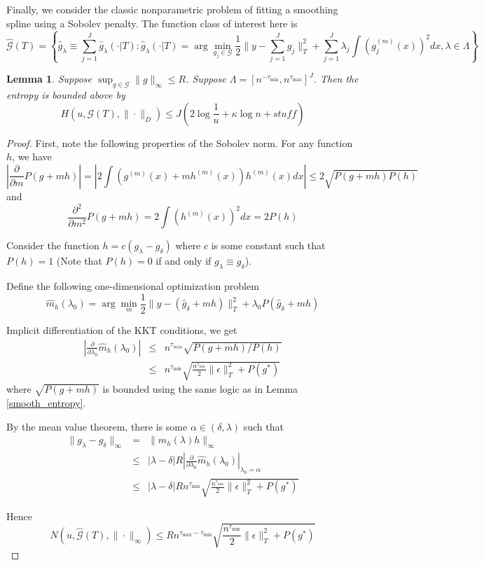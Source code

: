 \documentclass[12pt]{article}
\newtheorem{lemma}{Lemma}
\begin{document}
Finally, we consider the classic nonparametric problem of fitting a smoothing spline using a Sobolev penalty. The function class of interest here is
\[
\hat{\mathcal{G}}(T)=\left\{\hat{g}_\lambda \equiv \sum_{j=1}^J \hat{g}_{\lambda}(\cdot|T) :  \hat{g}_{\lambda}(\cdot|T)=\arg\min_{g_j\in\mathcal{G}}\frac{1}{2}\|y- \sum_{j=1}^J g_j\|_{T}^{2}+ \sum_{j=1}^J \lambda_j \int (g_j^{(m)}(x))^2 dx , \lambda\in\Lambda\right\} 
\]

\begin{lemma}
Suppose $\sup_{g \in \mathcal{G}} \|g\|_\infty \le R$.
Suppose $\Lambda = [n^{- \tau_{\min}} , n^{\tau_{\max}}]^J$. 
Then the entropy is bounded above by
\begin{equation}
H \left ( u, \mathcal{G}(T), \| \cdot \|_D \right ) \le J \left ( 2 \log \frac{1}{u} + \kappa \log n + stuff \right )
\end{equation}
\end{lemma}

\begin{proof}
First, note the following properties of the Sobolev norm. For any function $h$, we have
\[
\left | \frac{\partial}{\partial m}P(g+mh) \right | = \left | 2\int(g^{(m)}(x)+mh^{(m)}(x))h^{(m)}(x)dx \right | \le 2\sqrt{P(g+mh)P(h)}
\]
and 
\[
\frac{\partial^{2}}{\partial m^{2}}P(g+mh)=2\int(h^{(m)}(x))^{2}dx=2P(h)
\]

Consider the function $h=c(g_{\lambda}-g_{\delta})$ where $c$ is some constant such that $P(h) = 1$ (Note that $P(h) = 0$ if and only if $g_{\lambda} \equiv g_{\delta}$).

Define the following one-dimensional optimization problem
\[
\hat{m}_{h}(\lambda_0)=\arg\min_{m}\frac{1}{2}\|y-(\hat{g}_{\delta}+mh)\|_{T}^{2}+\lambda_0 P(\hat{g}_{\delta}+mh)
\]

Implicit differentiation of the KKT conditions, we get
\begin{eqnarray*}
\left|\frac{\partial}{\partial\lambda_0}\hat{m}_{h}(\lambda_0)\right| & \le & n^{\tau_{min}}\sqrt{P(g+mh) / P(h)}\\
 & \le & n^{\tau_{\min}}\sqrt{ \frac{n^{\tau_{\min}}}{2} \|\epsilon \|_T^2 +  P(g^*)}
\end{eqnarray*}
where $\sqrt{P(g+mh)}$ is bounded using the same logic as in Lemma \ref{smooth_entropy}.

By the mean value theorem, there is some $\alpha \in (\delta, \lambda)$ such that
\begin{eqnarray*}
\|g_{\lambda}-g_{\delta}\|_{\infty} & = & \|\hat{m}_{h}(\lambda)h\|_{\infty}\\
 & \le & |\lambda-\delta| R \left|\frac{\partial}{\partial\lambda_0}\hat{m}_{h}(\lambda_0)\right|_{\lambda_0 = \alpha}\\
 & \le & |\lambda-\delta| R n^{\tau_{\min}}\sqrt{ \frac{n^{\tau_{\min}}}{2} \|\epsilon \|_T^2 +  P(g^*)}
\end{eqnarray*}

Hence
\[
N\left(u,\hat{\mathcal{G}}(T),\|\cdot\|_{\infty}\right)\le R n^{\tau_{\max} - \tau_{\min}}\sqrt{ \frac{n^{\tau_{\min}}}{2} \|\epsilon \|_T^2 +  P(g^*)}
\]
\end{proof}
\end{document}
